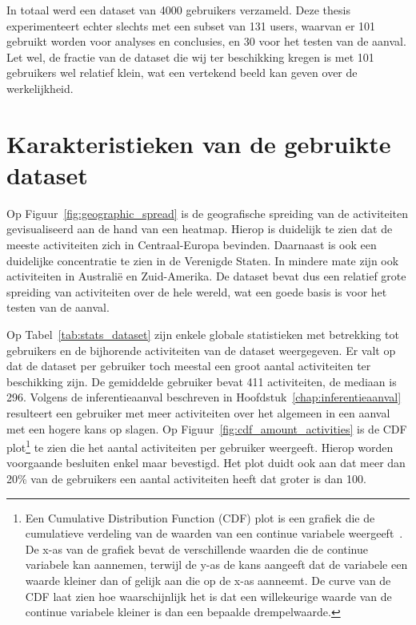 In totaal werd een dataset van 4000 gebruikers verzameld. Deze thesis
experimenteert echter slechts met een subset van 131 users, waarvan er 101
gebruikt worden voor analyses en conclusies, en 30 voor het testen van de
aanval. Let wel, de fractie van de dataset die wij ter beschikking kregen is
met 101 gebruikers wel relatief klein, wat een vertekend beeld kan geven over
de werkelijkheid.

\section{Karakteristieken van de gebruikte dataset}
Op Figuur~\ref{fig:geographic_spread} is de geografische spreiding van de
activiteiten gevisualiseerd aan de hand van een heatmap. Hierop is duidelijk te
zien dat de meeste activiteiten zich in Centraal-Europa bevinden. Daarnaast is
ook een duidelijke concentratie te zien in de Verenigde Staten. In mindere mate
zijn ook activiteiten in Australië en Zuid-Amerika. De dataset bevat dus een
relatief grote spreiding van activiteiten over de hele wereld, wat een goede
basis is voor het testen van de aanval.

Op Tabel~\ref{tab:stats_dataset} zijn enkele globale statistieken met
betrekking tot gebruikers en de bijhorende activiteiten van de dataset
weergegeven. Er valt op dat de dataset per gebruiker toch meestal een groot
aantal activiteiten ter beschikking zijn. De gemiddelde gebruiker bevat 411
activiteiten, de mediaan is 296. Volgens de inferentieaanval beschreven in
Hoofdstuk~\ref{chap:inferentieaanval} resulteert een gebruiker met meer
activiteiten over het algemeen in een aanval met een hogere kans op slagen. Op
Figuur~\ref{fig:cdf_amount_activities} is de \ac{CDF} plot\footnote{Een
    Cumulative Distribution Function (CDF) plot is een grafiek die de cumulatieve
    verdeling van de waarden van een continue variabele
    weergeeft~\cite{CursusSt38:online}. De x-as van de grafiek bevat de
    verschillende waarden die de continue variabele kan aannemen, terwijl de y-as
    de kans aangeeft dat de variabele een waarde kleiner dan of gelijk aan die op
    de x-as aanneemt. De curve van de CDF laat zien hoe waarschijnlijk het is dat
    een willekeurige waarde van de continue variabele kleiner is dan een bepaalde
    drempelwaarde.} te zien die het aantal activiteiten per gebruiker weergeeft.
Hierop worden voorgaande besluiten enkel maar bevestigd. Het plot duidt ook aan
dat meer dan 20\% van de gebruikers een aantal activiteiten heeft dat groter is
dan 100.

